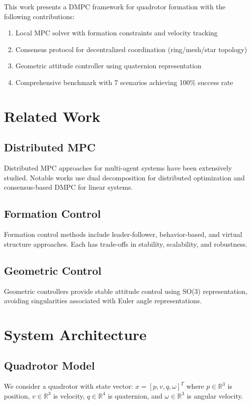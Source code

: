 \documentclass[10pt,article]{article}
\begin{document}
This work presents a DMPC framework for quadrotor formation with the following contributions:

\begin{enumerate}
    \item Local MPC solver with formation constraints and velocity tracking
    \item Consensus protocol for decentralized coordination (ring/mesh/star topology)
    \item Geometric attitude controller using quaternion representation
    \item Comprehensive benchmark with 7 scenarios achieving 100\% success rate
\end{enumerate}

\section{Related Work}

\subsection{Distributed MPC}
Distributed MPC approaches for multi-agent systems have been extensively studied. Notable works use dual decomposition for distributed optimization and consensus-based DMPC for linear systems.

\subsection{Formation Control}
Formation control methods include leader-follower, behavior-based, and virtual structure approaches. Each has trade-offs in stability, scalability, and robustness.

\subsection{Geometric Control}
Geometric controllers provide stable attitude control using SO(3) representation, avoiding singularities associated with Euler angle representations.

\section{System Architecture}

\subsection{Quadrotor Model}
We consider a quadrotor with state vector: $x = [p, v, q, \omega]^T$ where $p \in \mathbb{R}^3$ is position, $v \in \mathbb{R}^3$ is velocity, $q \in \mathbb{R}^4$ is quaternion, and $\omega \in \mathbb{R}^3$ is angular velocity.
\end{document}
